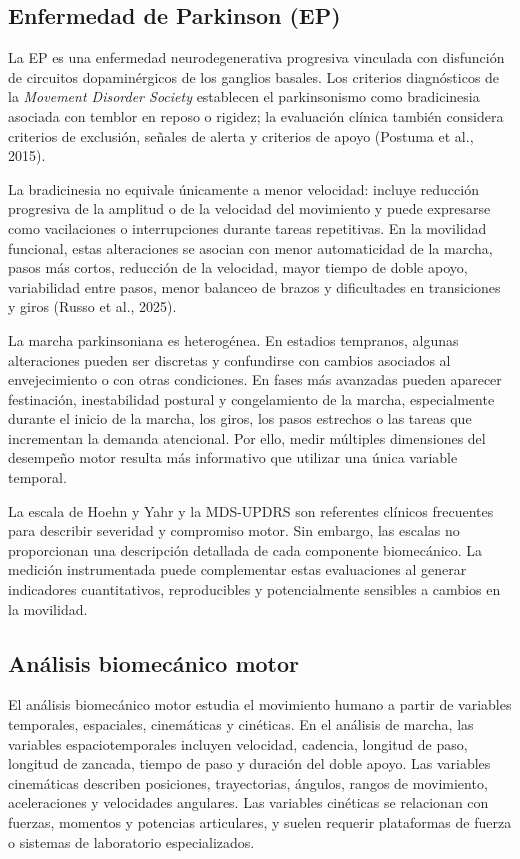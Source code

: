 \documentclass[12pt,a4paper]{article}
\begin{document}
\subsection{Enfermedad de Parkinson (EP)}\label{sec:ep}

La EP es una enfermedad neurodegenerativa progresiva vinculada con disfunción de circuitos dopaminérgicos de los ganglios basales. Los criterios diagnósticos de la \emph{Movement Disorder Society} establecen el parkinsonismo como bradicinesia asociada con temblor en reposo o rigidez; la evaluación clínica también considera criterios de exclusión, señales de alerta y criterios de apoyo (Postuma et al., 2015).

La bradicinesia no equivale únicamente a menor velocidad: incluye reducción progresiva de la amplitud o de la velocidad del movimiento y puede expresarse como vacilaciones o interrupciones durante tareas repetitivas. En la movilidad funcional, estas alteraciones se asocian con menor automaticidad de la marcha, pasos más cortos, reducción de la velocidad, mayor tiempo de doble apoyo, variabilidad entre pasos, menor balanceo de brazos y dificultades en transiciones y giros (Russo et al., 2025).

La marcha parkinsoniana es heterogénea. En estadios tempranos, algunas alteraciones pueden ser discretas y confundirse con cambios asociados al envejecimiento o con otras condiciones. En fases más avanzadas pueden aparecer festinación, inestabilidad postural y congelamiento de la marcha, especialmente durante el inicio de la marcha, los giros, los pasos estrechos o las tareas que incrementan la demanda atencional. Por ello, medir múltiples dimensiones del desempeño motor resulta más informativo que utilizar una única variable temporal.

La escala de Hoehn y Yahr y la MDS-UPDRS son referentes clínicos frecuentes para describir severidad y compromiso motor. Sin embargo, las escalas no proporcionan una descripción detallada de cada componente biomecánico. La medición instrumentada puede complementar estas evaluaciones al generar indicadores cuantitativos, reproducibles y potencialmente sensibles a cambios en la movilidad.

\subsection{Análisis biomecánico motor}\label{sec:biomecanico}

El análisis biomecánico motor estudia el movimiento humano a partir de variables temporales, espaciales, cinemáticas y cinéticas. En el análisis de marcha, las variables espaciotemporales incluyen velocidad, cadencia, longitud de paso, longitud de zancada, tiempo de paso y duración del doble apoyo. Las variables cinemáticas describen posiciones, trayectorias, ángulos, rangos de movimiento, aceleraciones y velocidades angulares. Las variables cinéticas se relacionan con fuerzas, momentos y potencias articulares, y suelen requerir plataformas de fuerza o sistemas de laboratorio especializados.
\end{document}
